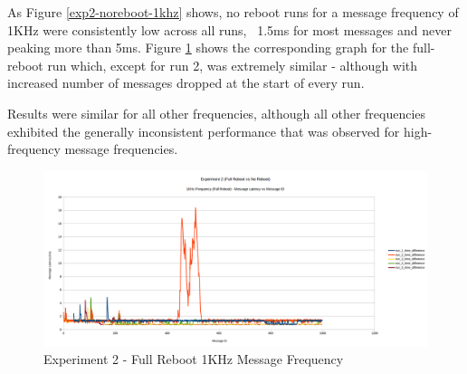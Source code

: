 \documentclass{l4proj}
\begin{document}
As Figure \ref{exp2-noreboot-1khz} shows, no reboot runs for a message frequency of 1KHz were consistently low across all runs, ~1.5ms for most messages and never peaking more than 5ms. Figure \ref{exp2-fullreboot-1khz} shows the corresponding graph for the full-reboot run which, except for run 2, was extremely similar - although with increased number of messages dropped at the start of every run.

Results were similar for all other frequencies, although all other frequencies exhibited the generally inconsistent performance that was observed for high-frequency message frequencies.

\begin{figure}[h]
\centering
\includegraphics[width=\textwidth]{images/full-reboot-1khz.png}
\caption{Experiment 2 - Full Reboot 1KHz Message Frequency}
\label{exp2-fullreboot-1khz}
\end{figure}
\end{document}
